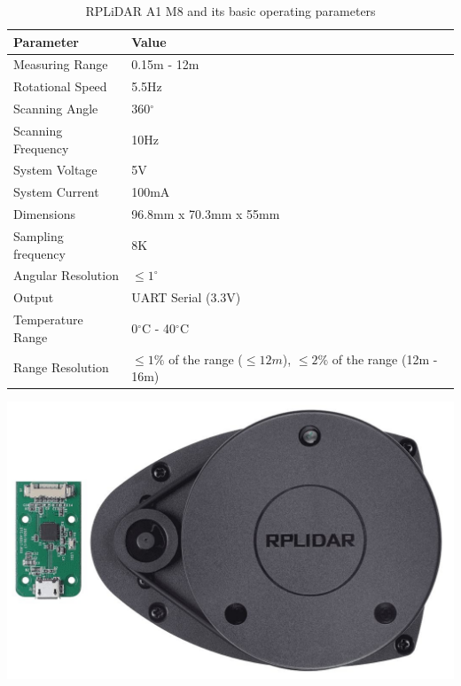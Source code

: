 \begin{table}[h]
    \begin{minipage}{0.5\textwidth}
    \centering
    \renewcommand{\arraystretch}{2.0}
    \setlength{\tabcolsep}{4.4pt}
    \footnotesize
    \begin{tabular}{|p{3cm}|p{4.4cm}|}
      \hline
      \rowcolor[gray]{0.8} 
      \textbf{Parameter} & \textbf{Value} \\
      \hline
      Measuring Range & 0.15m - 12m \\
      \hline
      Rotational Speed & 5.5Hz \\
      \hline
      Scanning Angle & 360$^{\circ}$ \\
      \hline
      Scanning Frequency & 10Hz \\
      \hline
      System Voltage & 5V \\
      \hline
      System Current & 100mA \\
      \hline
      Dimensions & 96.8mm x 70.3mm x 55mm \\
      \hline
      Sampling frequency & 8K \\      
      \hline
      Angular Resolution & $\leq 1^{\circ}$ \\
      \hline
      Output & UART Serial (3.3V) \\
      \hline
      Temperature Range & 0$^{\circ}$C - 40$^{\circ}$C \\
      \hline
      Range Resolution & $\leq 1\%$ of the range ($\leq 12m$), $\leq 2\%$ of the range (12m - 16m) \\
      \hline
    \end{tabular}
    \end{minipage}
    \begin{minipage}{0.55\textwidth}
        \centering
        \includegraphics[width=\linewidth, angle=90]{pics/lidar.png}
    \end{minipage}\hfill
    \caption{RPLiDAR A1 M8 and its basic operating parameters}\label{tab:lidar}
\end{table}



